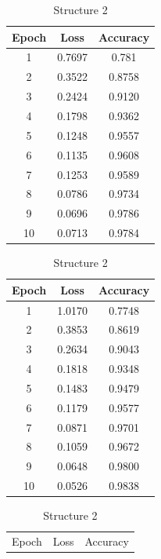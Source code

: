 \documentclass{article}
\begin{document}
\begin{table}[]
  \centering
  \begin{minipage}[b]{0.23\linewidth}
  \tiny
  \begin{tabular}{|c|c|c|}
    \hline
    Epoch&Loss&Accuracy\\
    \hline
    1&0.7697&0.781\\
    \hline
    2&0.3522&0.8758\\
    \hline
    3&0.2424&0.9120\\
    \hline
    4&0.1798&0.9362\\
    \hline
    5&0.1248&0.9557\\
    \hline
    6&0.1135&0.9608\\
    \hline
    7&0.1253&0.9589\\
    \hline
    8&0.0786&0.9734\\
    \hline
    9&0.0696&0.9786\\
    \hline
    10&0.0713&0.9784\\
    \hline
  \end{tabular}
  \caption*{Structure 1}
  \end{minipage}
  \hspace{0.5cm}
  \begin{minipage}[b]{0.23\linewidth}
  \tiny
  \begin{tabular}{|c|c|c|}
    \hline
    Epoch&Loss&Accuracy\\
    \hline
    1&1.0170&0.7748\\
    \hline
    2&0.3853&0.8619\\
    \hline
    3&0.2634&0.9043\\
    \hline
    4&0.1818&0.9348\\
    \hline
    5&0.1483&0.9479\\
    \hline
    6&0.1179&0.9577\\
    \hline
    7&0.0871&0.9701\\
    \hline
    8&0.1059&0.9672\\
    \hline
    9&0.0648&0.9800\\
    \hline
    10&0.0526&0.9838\\
    \hline
  \end{tabular}
  \caption*{Structure 2}
  \end{minipage}
  \hspace{0.5cm}
  \begin{minipage}[b]{0.23\linewidth}
  \tiny
  \begin{tabular}{|c|c|c|}
    \hline
    Epoch&Loss&Accuracy\\

\end{tabular}
\end{minipage}
\end{table}
\end{document}
